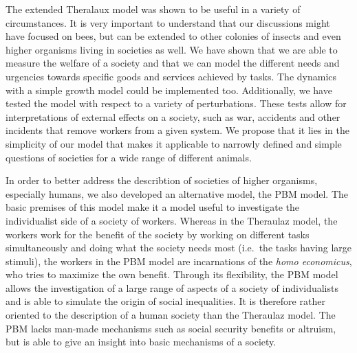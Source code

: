 The extended Theralaux model was shown to be useful in a variety of circumstances. It is very important to understand that our discussions might have focused on bees, but can be extended to other colonies of insects and even higher organisms living in societies as well. We have shown that we are able to measure the welfare of a society and that we can model the different needs and urgencies towards specific goods and services achieved by tasks. The dynamics with a simple growth model could be implemented too. Additionally, we have tested the model with respect to a variety of perturbations. These tests allow for interpretations of external effects on a society, such as war, accidents and other incidents that remove workers from a given system.
We propose that it lies in the simplicity of our model that makes it applicable to narrowly defined and simple questions of societies for a wide range of different animals.

In order to better address the describtion of societies of higher organisms, especially humans, we also developed an alternative model, the PBM model. The basic premises of this model make it a model useful to investigate the individualist side of a society of workers. Whereas in the Theraulaz model, the workers work for the benefit of the society by working on different tasks simultaneously and doing what the society needs most (i.e.\ the tasks having large stimuli), the workers in the PBM model are incarnations of the \emph{homo economicus}, who tries to maximize the own benefit. Through its flexibility, the PBM model allows the investigation of a large range of aspects of a society of individualists and is able to simulate the origin of social inequalities. It is therefore rather oriented to the description of a human society than the Theraulaz model.
The PBM lacks man-made mechanisms such as social security benefits or altruism, but is able to give an insight into basic mechanisms of a society.




